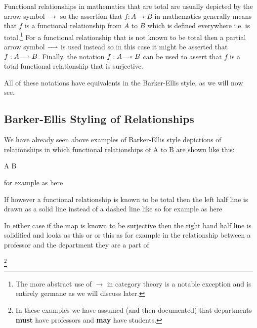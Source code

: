 \mynote Functional relationships in mathematics that are total are usually depicted by the arrow symbol $\longrightarrow$ so the assertion that $f:A \longrightarrow B$ in mathematics generally means that $f$ is a functional relationship from $A$ to $B$ which is defined everywhere i.e. is total.\footnote{The more abstract use of $\longrightarrow$ in category theory is a notable exception and is entirely germane as we will discuss later.} 
For a functional relationship that is not known to be total 
then a partial arrow symbol $-\kern-5pt\rightharpoonup$ is used instead so in this case it might be asserted that $f:A -\kern-5pt\rightharpoonup B$.
Finally, the notation $f: A -\kern-5pt\twoheadrightarrow B$ can be used to assert that $f$ is a total functional relationship that is surjective.  

\noindent All of these notations have equivalents in the Barker-Ellis style, as we will now see.

\subsection*{Barker-Ellis Styling of Relationships}
\mynote We have already seen above examples of Barker-Ellis style depictions of relationships in which functional relationships of A to B
are shown like this:
\begin{center}
A\,\barkerEllisA\,B
\end{center}
\noindent for example as here
\begin{center}

\end{center}
If however a functional relationship is known to be total then the left half line is drawn as a solid line instead of a dashed line like so \barkerEllisC
for example as here 
\begin{center}

\end{center}
In either case if the map is known to be surjective then the right hand half line is solidified and looks as this \barkerEllisB or \barkerEllisD
or this
as for example in the relationship between a professor and the department they are a part of 
\begin{center}

\end{center}
\footnote{In these examples we have assumed (and then documented) that departments \textbf{must} have professors and \textbf{may} have students.}

